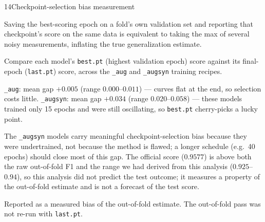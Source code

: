 \begin{explog}{14}{Checkpoint-selection bias measurement}
\item[Hypothesis] Saving the best-scoring epoch on a fold's own validation set and reporting that checkpoint's score on the same data is equivalent to taking the max of several noisy measurements, inflating the true generalization estimate.
\item[Method] Compare each model's \texttt{best.pt} (highest validation epoch) score against its final-epoch (\texttt{last.pt}) score, across the \texttt{\_aug} and \texttt{\_augsyn} training recipes.
\item[Result] \texttt{\_aug}: mean gap $+0.005$ (range $0.000$--$0.011$) --- curves flat at the end, so selection costs little. \texttt{\_augsyn}: mean gap $+0.034$ (range $0.020$--$0.058$) --- these models trained only 15 epochs and were still oscillating, so \texttt{best.pt} cherry-picks a lucky point.
\item[Inference] The \texttt{\_augsyn} models carry meaningful checkpoint-selection bias because they were undertrained, not because the method is flawed; a longer schedule (e.g.\ 40 epochs) should close most of this gap. The official score ($0.9577$) is above both the raw out-of-fold F1 and the range we had derived from this analysis ($0.925$--$0.94$), so this analysis did not predict the test outcome; it measures a property of the out-of-fold estimate and is not a forecast of the test score.
\item[Verdict] Reported as a measured bias of the out-of-fold estimate. The out-of-fold pass was not re-run with \texttt{last.pt}.
\end{explog}


